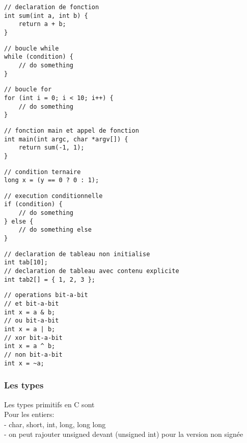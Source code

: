 \documentclass[a4paper,10pt]{article} %
\begin{document}
\begin{multicols}{2}
\begin{lstlisting}[frame=single]
// declaration de fonction
int sum(int a, int b) {
    return a + b;
}
\end{lstlisting}

\begin{lstlisting}[frame=single]
// boucle while
while (condition) {
    // do something
}
\end{lstlisting}

\begin{lstlisting}[frame=single]
// boucle for
for (int i = 0; i < 10; i++) {
    // do something
}
\end{lstlisting}

\begin{lstlisting}[frame=single]
// fonction main et appel de fonction
int main(int argc, char *argv[]) {
    return sum(-1, 1);
}
\end{lstlisting}

\begin{lstlisting}[frame=single]
// condition ternaire
long x = (y == 0 ? 0 : 1);
\end{lstlisting}

\begin{lstlisting}[frame=single]
// execution conditionnelle
if (condition) {
    // do something
} else {
    // do something else
}
\end{lstlisting}

\begin{lstlisting}[frame=single]
// declaration de tableau non initialise
int tab[10];
// declaration de tableau avec contenu explicite
int tab2[] = { 1, 2, 3 };
\end{lstlisting}

\begin{lstlisting}[frame=single]
// operations bit-a-bit
// et bit-a-bit
int x = a & b;
// ou bit-a-bit
int x = a | b;
// xor bit-a-bit
int x = a ^ b;
// non bit-a-bit
int x = ~a;
\end{lstlisting}

\end{multicols}

\subsubsection{Les types}
Les types primitifs en C sont\\

Pour les entiers:\\
- char, short, int, long, long long\\
- on peut rajouter unsigned devant (unsigned int) pour la version non signée\\
\end{document}
